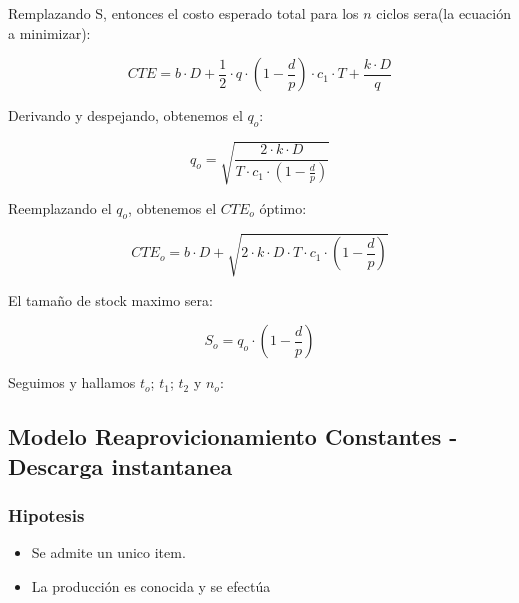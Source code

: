 \documentclass{article}
\begin{document}
Remplazando S, entonces el costo esperado total para los \(n\) ciclos sera(la ecuación a minimizar):

\begin{equation}
    CTE = b \cdot D + \frac{1}{2} \cdot q \cdot (1-\frac{d}{p}) \cdot c_1 \cdot T + \frac{k \cdot D}{q} 
\end{equation}

Derivando y despejando, obtenemos el \(q_o\):

\begin{equation}
    q_o = \sqrt{\frac{2 \cdot k \cdot D}{T \cdot c_1 \cdot (1-\frac{d}{p})}}
\end{equation}

Reemplazando el \(q_o\), obtenemos el \(CTE_o\) óptimo:

\begin{equation}
    CTE_o = b \cdot D + \sqrt{2 \cdot k \cdot D \cdot T \cdot c_1 \cdot (1-\frac{d}{p})}
\end{equation}

El tamaño de  stock maximo sera:

\begin{equation}
    S_o = q_o \cdot (1-\frac{d}{p})
\end{equation}

Seguimos y hallamos \(t_o\); \(t_1\); \(t_2\) y \(n_o\):




\subsection{Modelo Reaprovicionamiento Constantes - Descarga instantanea}

\subsubsection{Hipotesis}
\begin{itemize}
    \item Se admite un unico item.
    \item La producción es conocida y se efectúa
\end{itemize}
\end{document}
